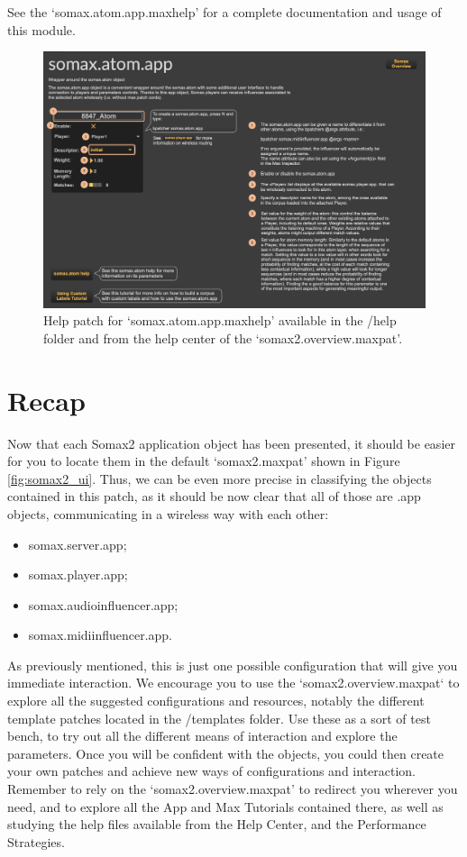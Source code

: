 See the `somax.atom.app.maxhelp' for a complete documentation and usage of this module. 

\begin{figure}[H]
    \centering        
 	\includegraphics[width=1\textwidth, keepaspectratio]{img/atom_app_help.png}
    \caption{Help patch for `somax.atom.app.maxhelp' available in the /help folder and from the help center of the `somax2.overview.maxpat'.}
    \label{fig:atom_app_help}
\end{figure}


\section{Recap}

Now that each Somax2 application object has been presented, it should be easier for you to locate them in the default `somax2.maxpat' shown in Figure \ref{fig:somax2_ui}. 
Thus, we can be even more precise in classifying the objects contained in this patch, as it should be now clear that all of those are .app objects, communicating in a wireless way with each other:

\begin{itemize}
    \item somax.server.app;
    \item somax.player.app;
    \item somax.audioinfluencer.app;
    \item somax.midiinfluencer.app.
\end{itemize}

\noindent As previously mentioned, this is just one possible configuration that will give you immediate interaction. We encourage you to use the `somax2.overview.maxpat` to explore all the suggested configurations and resources, notably the different template patches located in the /templates folder. Use these as a sort of test bench, to try out all the different means of interaction and explore the parameters. Once you will be confident with the objects, you could then create your own patches and achieve new ways of configurations and interaction.
Remember to rely on the `somax2.overview.maxpat' to redirect you wherever you need, and to explore all the App and Max Tutorials contained there, as well as studying the help files available from the Help Center, and the Performance Strategies.

